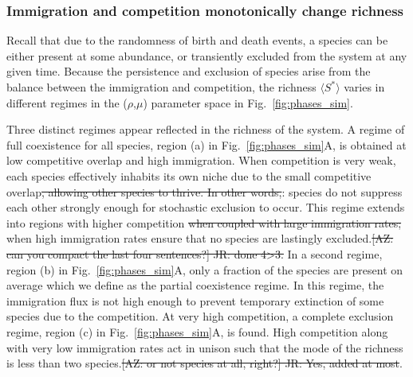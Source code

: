 \documentclass[9pt,twocolumn,twoside,lineno]{pnas-new}
\begin{document}
\subsubsection{Immigration and competition monotonically change richness}
%
Recall that due to the randomness of birth and death events, a species can be either present at some abundance, or transiently excluded from the system at any given time. %
Because the persistence and exclusion of species arise from the balance between the immigration and competition, the richness {$\langle S^* \rangle$} varies in different regimes in the ($\rho$,$\mu$) parameter space in Fig.~\ref{fig:phases_sim}.

Three distinct regimes appear reflected in the richness of the system. 
A regime of full coexistence for all species, region (a) in Fig.~\ref{fig:phases_sim}A, is obtained at low competitive overlap and high immigration. 
When competition is very weak, each species effectively inhabits its own niche due to the small competitive overlap\st{, allowing other species to thrive.
In other words,}: species do not suppress each other strongly enough for stochastic exclusion to occur.
This regime extends into regions with higher competition\st{ when coupled with large immigration rates;} when high immigration rates ensure that no species are lastingly excluded.\st{[AZ: can you compact the last four sentences?] JR: done 4>3.}
In a second regime, region (b) in Fig.~\ref{fig:phases_sim}A, only a fraction of the species are present on average which we define as the partial coexistence regime. 
In this regime, the immigration flux is not high enough to prevent temporary extinction of some species due to the competition. %
At very high competition, a complete exclusion regime, region (c) in Fig.~\ref{fig:phases_sim}A, is found. 
High competition along with very low immigration rates act in unison such that the mode of the richness is less than two species.\st{[AZ: or not species at all, right?] JR: Yes, added at most}.
\end{document}
